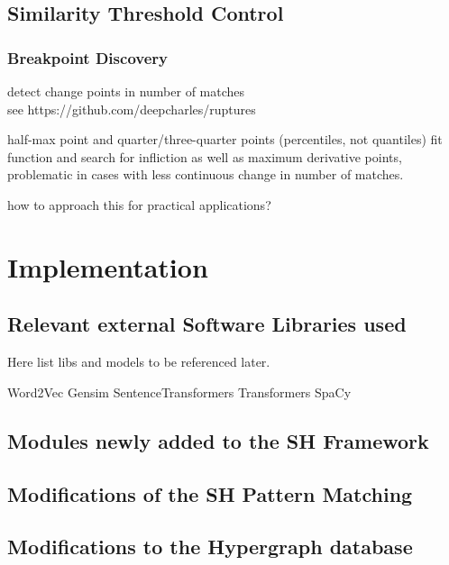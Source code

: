 \documentclass[11pt]{scrreprt}
\begin{document}
\section{Similarity Threshold Control}

\subsection{Breakpoint Discovery}
detect change points in number of matches \\ 
see https://github.com/deepcharles/ruptures

half-max point and quarter/three-quarter points (percentiles, not quantiles)
fit function and search for infliction as well as maximum derivative points,
problematic in cases with less continuous change in number of matches.

how to approach this for practical applications?


\chapter{Implementation}
\label{cha:implementation}

\section{Relevant external Software Libraries used}
Here list libs and models to be referenced later.

Word2Vec
Gensim
SentenceTransformers
Transformers
SpaCy

\section{Modules newly added to the SH Framework}
\section{Modifications of the SH Pattern Matching}
\section{Modifications to the Hypergraph database}




\end{document}
